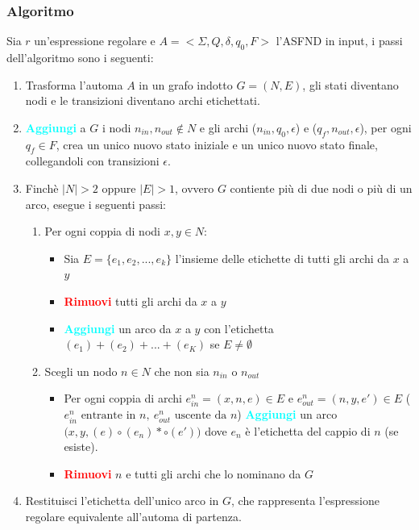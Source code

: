 \subsubsection{Algoritmo}
    Sia $r$ un'espressione regolare e $A = <\Sigma,Q,\delta,q_0,F>$ l'ASFND in input, i passi dell'algoritmo sono i seguenti:
    \begin{enumerate}
        \item Trasforma l'automa $A$ in un grafo indotto $G=(N,E)$, gli stati diventano nodi e le transizioni diventano archi etichettati.
        \item \textcolor{cyan}{\textbf{Aggiungi}} a $G$ i nodi $n_{in},n_{out} \notin N$ e gli archi 
        ($n_{in},q_0,\epsilon$) e ($q_f,n_{out},\epsilon$), per ogni $q_f \in F$, crea un unico nuovo stato iniziale e un unico nuovo stato finale, 
        collegandoli con transizioni \(\epsilon\).
        \item Finchè $|N|>2$ oppure $|E|>1$, ovvero $G$ contiente più di due nodi o più di un arco, esegue i seguenti passi:
        \begin{enumerate}
            \item Per ogni coppia di nodi $x,y \in N$:
            \begin{itemize}[label=--]
                \item Sia $E = \{ e_1,e_2,...,e_k  \}$ l'insieme delle etichette di tutti gli archi da $x$ a $y$
                \item \textcolor{red}{\textbf{Rimuovi}} tutti gli archi da $x$ a $y$
                \item \textcolor{cyan}{\textbf{Aggiungi}} un arco da $x$ a $y$ con l'etichetta $(e_1)+(e_2)+...+(e_K)$ se $E \neq \emptyset$ 
            \end{itemize}
            \item Scegli un nodo $n\in N$ che non sia $n_{in}$ o $n_{out}$
            \begin{itemize}[label = --]
                \item Per ogni coppia di archi $e_{in}^{n} = (x,n,e) \in E$ e $e_{out}^{n} = (n,y,e')\in E$
                ($ e_{in}^{n} \text{ entrante in } n, \ e_{out}^{n} \text{ uscente da } n $) \textcolor{cyan}{\textbf{Aggiungi}} un arco
                $\Big(  x,y,(e) \circ (e_n)* \circ (e')    \Big)$ dove $e_n$ è l'etichetta del cappio di $n$ (se esiste).
                \item \textcolor{red}{\textbf{Rimuovi}} $n$ e tutti gli archi che lo nominano da $G$
            \end{itemize}
        \end{enumerate}

        \item Restituisci l'etichetta dell'unico arco in $G$, che rappresenta l'espressione regolare equivalente all'automa di partenza.
    \end{enumerate}

